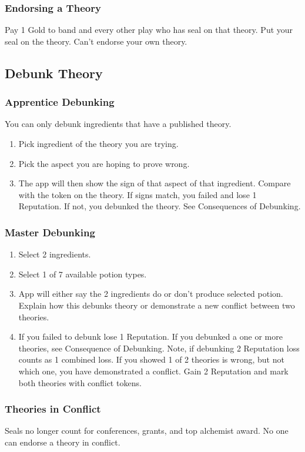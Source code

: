\documentclass[12pt]{article}
\newenvironment{enumerateCustom}
{\begin{enumerate}
  \setlength{\itemsep}{1pt}
  \setlength{\parskip}{0pt}
  \setlength{\parsep}{0pt}}
{\end{enumerate}}
\begin{document}
\begin{multicols*}{2}
\subsubsection*{Endorsing a Theory} Pay 1 Gold to band and every other play who has seal on that theory. Put your seal on the theory. Can't endorse your own theory.

\subsection*{Debunk Theory}
\subsubsection*{Apprentice Debunking}
You can only debunk ingredients that have a published theory.

\begin{enumerateCustom}
    \item Pick ingredient of the theory you are trying.
    \item Pick the aspect you are hoping to prove wrong.
    \item The app will then show the sign of that aspect of that ingredient. Compare with the token on the theory. If signs match, you failed and lose 1 Reputation. If not, you debunked the theory. See Consequences of Debunking.
\end{enumerateCustom}

\subsubsection*{Master Debunking}
\begin{enumerateCustom}
    \item Select 2 ingredients.
    \item Select 1 of 7 available potion types.
    \item App will either say the 2 ingredients do or don't produce selected potion. Explain how this debunks theory or demonstrate a new conflict between two theories.
    \item If you failed to debunk lose 1 Reputation. If you debunked a one or more theories, see Consequence of Debunking. Note, if debunking 2 Reputation loss counts as 1 combined loss. If you showed 1 of 2 theories is wrong, but not which one, you have demonstrated a conflict. Gain 2 Reputation and mark both theories with conflict tokens.
\end{enumerateCustom}

\subsubsection*{Theories in Conflict}
Seals no longer count for conferences, grants, and top alchemist award. No one can endorse a theory in conflict.


\end{multicols*}
\end{document}
